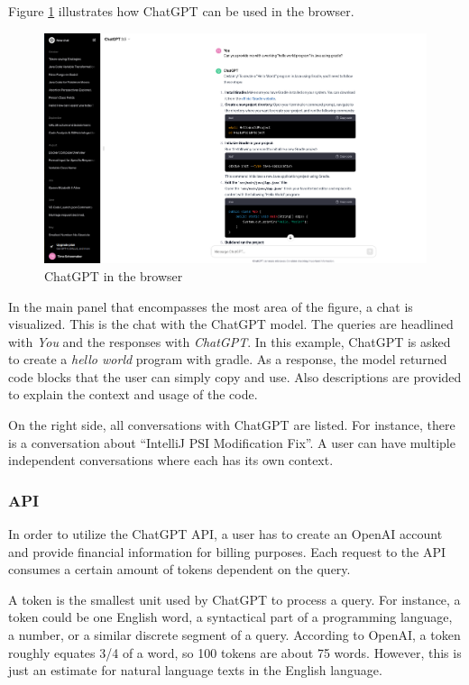 Figure \ref{fig:chatgpt_browser} illustrates how ChatGPT can be used in the browser.
\begin{figure}
    \centering
\includegraphics[width=\columnwidth]{figures/chapter2/chatgpt_browser.png}
    \caption{ChatGPT in the browser}
    \label{fig:chatgpt_browser}
\end{figure}
In the main panel that encompasses the most area of the figure, a chat is visualized. This is the chat with the ChatGPT model. The queries are headlined with \textit{You} and the responses with \textit{ChatGPT}. In this example, ChatGPT is asked to create a \textit{hello world} program with gradle. As a response, the model returned code blocks that the user can simply copy and use. Also descriptions are provided to explain the context and usage of the code.

On the right side, all conversations with ChatGPT are listed. For instance, there is a conversation about \enquote{IntelliJ PSI Modification Fix}. A user can have multiple independent conversations where each has its own context. 

\subsubsection{API}
In order to utilize the ChatGPT \ac{API}, a user has to create an OpenAI account and provide financial information for billing purposes. Each request to the API consumes a certain amount of tokens dependent on the query. 

A token is the smallest unit used by ChatGPT to process a query. For instance, a token could be one English word, a syntactical part of a programming language, a number, or a similar discrete segment of a query. According to OpenAI, a token roughly equates 3/4 of a word, so 100 tokens are about 75 words. However, this is just an estimate for natural language texts in the English language. 

